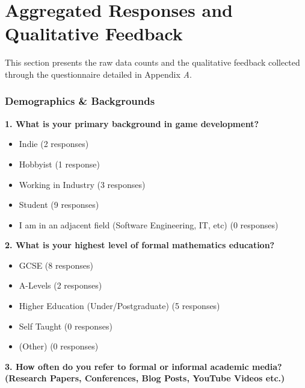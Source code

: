 \pagebreak


\section{Aggregated Responses and Qualitative Feedback}
\label{sec:questionnaire_responses}

This section presents the raw data counts and the qualitative feedback collected through the questionnaire detailed in Appendix \textit{A}.

\subsubsection{Demographics \& Backgrounds}

\textbf{1. What is your primary background in game development?}

\begin{itemize}
    \item Indie (2 responses)
    \item Hobbyist (1 response)
    \item Working in Industry (3 responses)
    \item Student (9 responses)
    \item I am in an adjacent field (Software Engineering, IT, etc) (0 responses)
\end{itemize}

\vspace{2em}

\textbf{2. What is your highest level of formal mathematics education?}

\begin{itemize}
    \item GCSE (8 responses)
    \item A-Levels (2 responses)
    \item Higher Education (Under/Postgraduate) (5 responses)
    \item Self Taught (0 responses)
    \item (Other) (0 responses)
\end{itemize}

\vspace{2em}

\textbf{3. How often do you refer to formal or informal academic media? (Research Papers, Conferences, Blog Posts, YouTube Videos etc.)}

